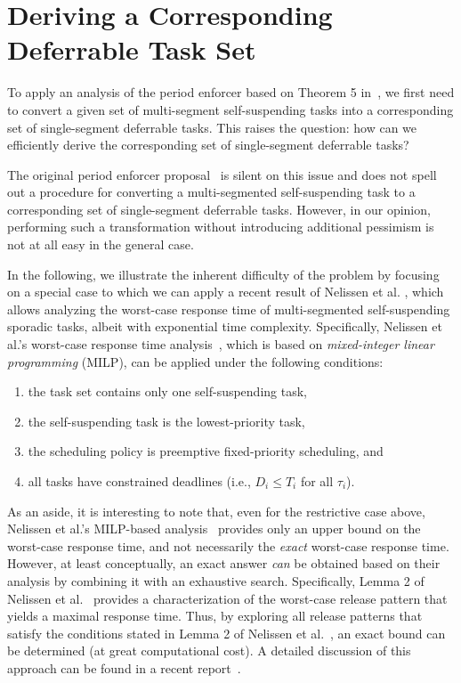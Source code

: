 
\section{Deriving a Corresponding Deferrable Task Set}
\label{sec:convert}

To apply an analysis of the period enforcer based on Theorem 5 in~\cite{Raj:suspension1991}, we first need to convert a given set of multi-segment self-suspending tasks into a corresponding set of single-segment deferrable tasks. This raises the question: how can we efficiently derive the corresponding set of single-segment deferrable tasks? 

The original period enforcer proposal~\cite{Raj:suspension1991} is silent on this issue and does not spell out a procedure for converting a multi-segmented self-suspending task to a corresponding set of single-segment deferrable tasks. However, in our opinion, performing such a transformation without introducing additional pessimism is not at all easy in the general case.

In the following, we illustrate the inherent difficulty of the problem by focusing on a special case to which we can apply a recent result of Nelissen et al. \cite{ecrts15nelissen}, which allows analyzing the worst-case response time of multi-segmented self-suspending sporadic tasks, albeit with exponential time complexity. Specifically,  
Nelissen et al.'s worst-case response time analysis~\cite{ecrts15nelissen}, which is based on \emph{mixed-integer linear programming} (MILP), can be applied under the following conditions:
\begin{enumerate}
	\item the task set contains only one self-suspending task, 
	\item the self-suspending task is the lowest-priority task, 
	\item the scheduling policy is preemptive fixed-priority scheduling, and 
	\item all tasks have constrained deadlines (i.e., $D_i \leq T_i$ for all $\tau_i$).
\end{enumerate}

As an aside, it is interesting to note that, even for the restrictive case above,  Nelissen et al.'s MILP-based analysis~\cite{ecrts15nelissen} provides only an upper bound on the worst-case response time, and not necessarily the \emph{exact} worst-case response time. However, at least conceptually, an exact answer \emph{can} be obtained based on their analysis by combining it with an exhaustive search. Specifically, Lemma 2 of Nelissen et al.~\cite{ecrts15nelissen} provides a characterization of the worst-case release pattern that yields a maximal response time. Thus, by exploring all  release patterns that satisfy the conditions stated in Lemma 2 of Nelissen et al.~\cite{ecrts15nelissen}, an exact bound can be determined (at great computational cost). A detailed discussion of this approach can be found in a recent report~\cite{Chen2016b}. 

